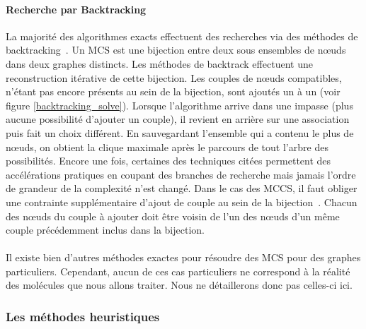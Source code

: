 \documentclass[12pt,french,twoside]{report}
\begin{document}
\paragraph{Recherche par Backtracking}
La majorité des algorithmes exacts effectuent des recherches via des méthodes de backtracking~\cite{manic_branch&cut_2009,mcgregor_backtrack_1982,kawabata_build-up_2011}.
Un MCS est une bijection entre deux sous ensembles de n\oe{}uds dans deux graphes distincts.
Les méthodes de backtrack effectuent une reconstruction itérative de cette bijection.
Les couples de n\oe{}uds compatibles, n'étant pas encore présents au sein de la bijection, sont ajoutés un à un (voir figure \ref{backtracking_solve}).
Lorsque l'algorithme arrive dans une impasse (plus aucune possibilité d'ajouter un couple), il revient en arrière sur une association puis fait un choix différent.
En sauvegardant l'ensemble qui a contenu le plus de n\oe{}uds, on obtient la clique maximale après le parcours de tout l'arbre des possibilités.
Encore une fois, certaines des techniques citées permettent des accélérations pratiques en coupant des branches de recherche mais jamais l'ordre de grandeur de la complexité n'est changé.
Dans le cas des MCCS, il faut obliger une contrainte supplémentaire d'ajout de couple au sein de la bijection~\cite{chang_moderately_2014}.
Chacun des n\oe{}uds du couple à ajouter doit être voisin de l'un des n\oe{}uds d'un même couple précédemment inclus dans la bijection.

\paragraph{}Il existe bien d'autres méthodes exactes pour résoudre des MCS pour des graphes particuliers.
Cependant, aucun de ces cas particuliers ne correspond à la réalité des molécules que nous allons traiter.
Nous ne détaillerons donc pas celles-ci ici.


\subsubsection{Les méthodes heuristiques}
\end{document}
